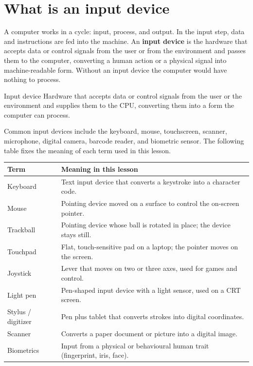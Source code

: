 \section{What is an input device}
A computer works in a cycle: input, process, and output. In the input step,
data and instructions are fed into the machine. An \textbf{input device} is
the hardware that accepts data or control signals from the user or from the
environment and passes them to the computer, converting a human action or a
physical signal into machine-readable form. Without an input device the
computer would have nothing to process.

\begin{definitionbox}{Input device}
Hardware that accepts data or control signals from the user or the
environment and supplies them to the CPU, converting them into a form the
computer can process.
\end{definitionbox}

Common input devices include the keyboard, mouse, touchscreen, scanner,
microphone, digital camera, barcode reader, and biometric sensor. The
following table fixes the meaning of each term used in this lesson.

\begin{center}
\begin{tabular}{p{}p{}}
\toprule
\textbf{Term} & \textbf{Meaning in this lesson} \\
\midrule
Keyboard & Text input device that converts a keystroke into a character code. \\
Mouse & Pointing device moved on a surface to control the on-screen pointer. \\
Trackball & Pointing device whose ball is rotated in place; the device stays still. \\
Touchpad & Flat, touch-sensitive pad on a laptop; the pointer moves on the screen. \\
Joystick & Lever that moves on two or three axes, used for games and control. \\
Light pen & Pen-shaped input device with a light sensor, used on a CRT screen. \\
Stylus / digitizer & Pen plus tablet that converts strokes into digital coordinates. \\
Scanner & Converts a paper document or picture into a digital image. \\
Biometrics & Input from a physical or behavioural human trait (fingerprint, iris, face). \\
\bottomrule
\end{tabular}
\end{center}

